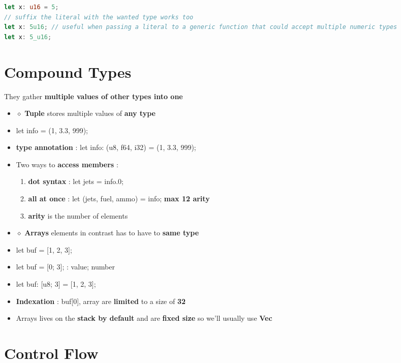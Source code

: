 \documentclass{report}
\begin{document}
\begin{multicols*}{2}
\begin{tcolorbox}[title=Suffixe variable type,colback=backcolour,size=small,left=4mm]
\begin{lstlisting}[language=rust]
let x: u16 = 5;
// suffix the literal with the wanted type works too
let x: 5u16; // useful when passing a literal to a generic function that could accept multiple numeric types
let x: 5_u16;
\end{lstlisting}
\end{tcolorbox}

\section{Compound Types}

  They gather \textbf{multiple values of other types into one}

\begin{itemize}
  \item $\diamond$ \textbf{Tuple} stores multiple values of \textbf{any type} 
  \item let info = (1, 3.3, 999); 
  \item \textbf{type annotation} : let info: (u8, f64, i32) = (1, 3.3, 999); 
  \item Two ways to \textbf{access members} :
    \begin{enumerate}
      \item \textbf{dot syntax} : let jets = info.0; 
      \item \textbf{all at once} : let (jets, fuel, ammo) = info; \textbf{max 12 arity} 
      \item \textbf{arity} is the number of elements
    \end{enumerate}
  \item $\diamond $ \textbf{Arrays} elements in contrast has to have to \textbf{same type} 
  \item let buf = [1, 2, 3]; 
  \item let buf = [0; 3]; : value; number 
  \item let buf: [u8; 3] = [1, 2, 3]; 
  \item \textbf{Indexation} : buf[0], array are \textbf{limited} to a size of \textbf{32} 
  \item Arrays lives on the \textbf{stack by default} and are \textbf{fixed size} so we'll usually use \textbf{Vec} 
\end{itemize}

\section{Control Flow}


\end{multicols*}
\end{document}
